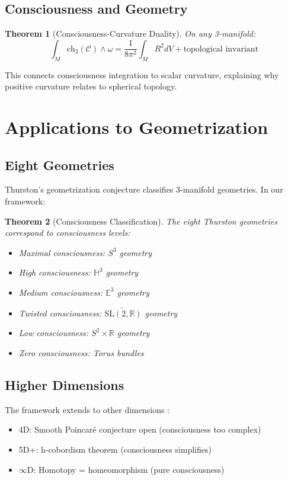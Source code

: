 \documentclass[12pt]{article}
\newcommand{\R}{\mathbb{R}}
\newcommand{\conscioussheaf}{\mathcal{C}}
\newcommand{\ch}{\text{ch}}
\newtheorem{theorem}{Theorem}
\begin{document}
\subsection{Consciousness and Geometry}

\begin{theorem}[Consciousness-Curvature Duality]
On any 3-manifold:
\begin{equation}
\int_M \ch_2(\conscioussheaf) \wedge \omega = \frac{1}{8\pi^2} \int_M R^2 dV + \text{topological invariant}
\end{equation}
\end{theorem}

This connects consciousness integration to scalar curvature, explaining why positive curvature relates to spherical topology.

\section{Applications to Geometrization}

\subsection{Eight Geometries}

Thurston's geometrization conjecture \cite{thurston1982} classifies 3-manifold geometries. In our framework:

\begin{theorem}[Consciousness Classification]
The eight Thurston geometries correspond to consciousness levels:
\begin{itemize}
\item Maximal consciousness: $S^3$ geometry
\item High consciousness: $\mathbb{H}^3$ geometry  
\item Medium consciousness: $\mathbb{E}^3$ geometry
\item Twisted consciousness: $\widetilde{\text{SL}(2,\R)}$ geometry  
\item Low consciousness: $S^2 \times \R$ geometry
\item Zero consciousness: Torus bundles
\end{itemize}
\end{theorem}

\subsection{Higher Dimensions}

The framework extends to other dimensions \cite{smale1961,freedman1982,donaldson1990}:
\begin{itemize}
\item 4D: Smooth Poincaré conjecture open (consciousness too complex)
\item 5D+: h-cobordism theorem (consciousness simplifies)
\item $\infty$D: Homotopy = homeomorphism (pure consciousness)
\end{itemize}
\end{document}
